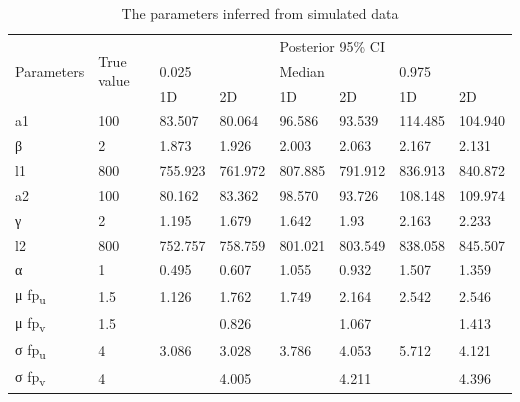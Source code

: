





\begin{table}[tb]
\centerfloat
\caption{The parameters inferred from simulated data}
\label{tab:inf_params_sim}
\begin{tabular}{ll|llllll}
\multirow{3}{*}{Parameters} & \multirow{3}{*}{True value} & \multicolumn{6}{c}{Posterior 95\% CI} \\ \cline{3-8} 
 &  & 0.025 &  & Median &  & 0.975 &  \\ \cline{3-8} 
 &  & 1D & 2D & 1D & \multicolumn{1}{l|}{2D} & 1D & 2D \\ \hline
a1 & 100 & 83.507 & \multicolumn{1}{l|}{80.064} & 96.586 & \multicolumn{1}{l|}{93.539} & 114.485 & 104.940 \\
β & 2 & 1.873 & \multicolumn{1}{l|}{1.926} & 2.003 & \multicolumn{1}{l|}{2.063} & 2.167 & 2.131 \\
l1 & 800 & 755.923 & \multicolumn{1}{l|}{761.972} & 807.885 & \multicolumn{1}{l|}{791.912} & 836.913 & 840.872 \\
a2 & 100 & 80.162 & \multicolumn{1}{l|}{83.362} & 98.570 & \multicolumn{1}{l|}{93.726} & 108.148 & 109.974 \\
γ & 2 & 1.195 & \multicolumn{1}{l|}{1.679} & 1.642 & \multicolumn{1}{l|}{1.93} & 2.163 & 2.233 \\
l2 & 800 & 752.757 & \multicolumn{1}{l|}{758.759} & 801.021 & \multicolumn{1}{l|}{803.549} & 838.058 & 845.507 \\
α & 1 & 0.495 & \multicolumn{1}{l|}{0.607} & 1.055 & \multicolumn{1}{l|}{0.932} & 1.507 & 1.359 \\
μ fp\textsubscript{u} & 1.5 & 1.126 & \multicolumn{1}{l|}{1.762} & 1.749 & \multicolumn{1}{l|}{2.164} & 2.542 & 2.546 \\
μ fp\textsubscript{v} & 1.5 &  & \multicolumn{1}{l|}{0.826} &  & \multicolumn{1}{l|}{1.067} &  & 1.413 \\
σ fp\textsubscript{u} & 4 & 3.086 & \multicolumn{1}{l|}{3.028} & 3.786 & \multicolumn{1}{l|}{4.053} & 5.712 & 4.121 \\
σ fp\textsubscript{v} & 4 &  & \multicolumn{1}{l|}{4.005} &  & \multicolumn{1}{l|}{4.211} &  & 4.396 \\ \hline
\end{tabular}
\end{table}
